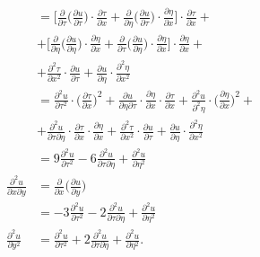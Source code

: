 \documentclass[11pt,a4paper]{article}
\theoremstyle{dotless}
\theoremstyle{dotlessdr}
\begin{document}
\begin{align*}
                                &= \Big[ \frac{\partial}{\partial \tau} \Big(\frac{\partial u}{\partial \tau}\Big) \cdot %
                                  \frac{\partial \tau}{\partial x} + \frac{\partial}{\partial \eta} \Big(\frac{\partial u}{\partial \tau}\Big) \cdot %
                                  \frac{\partial \eta}{\partial x} \Big] \cdot \frac{\partial \tau}{\partial x} + \\
                                &+ \Big[ \frac{\partial}{\partial \eta} \Big(\frac{\partial u}{\partial \eta}\Big) \cdot %
                                  \frac{\partial \eta}{\partial x} + \frac{\partial}{\partial \tau} \Big(\frac{\partial u}{\partial \eta}\Big) \cdot %
                                  \frac{\partial \eta}{\partial x} \Big] \cdot \frac{\partial \eta}{\partial x} + \\
                                &+ \frac{\partial^2 \tau}{\partial x^2} \cdot \frac{\partial u}{\partial \tau} + %
                                  \frac{\partial u}{\partial \eta} \cdot \frac{\partial^2 \eta}{\partial x^2} \\
                                &= \frac{\partial^2 u}{\partial \tau^2} \cdot \Big( \frac{\partial \tau}{\partial x} \Big)^2 + %
                                  \frac{\partial u}{\partial \eta \partial \tau} \cdot \frac{\partial \eta}{\partial x} \cdot \frac{\partial \tau}{\partial x} + %
                                  \frac{\partial^2 u}{\partial^2 \eta} \cdot \Big( \frac{\partial \eta}{\partial x} \Big)^2 + \\
                                &+ \frac{\partial^2 u}{\partial \tau\partial \eta} \cdot \frac{\partial \tau}{\partial x} \cdot \frac{\partial \eta}{\partial x} + %
                                  \frac{\partial^2 \tau}{\partial x^2} \cdot \frac{\partial u}{\partial \tau} + \frac{\partial u}{\partial \eta} \cdot %
                                  \frac{\partial^2 \eta}{\partial x^2} \\
                                &= 9 \frac{\partial^2 u}{\partial \tau^2} - %
                                      6 \frac{\partial^2 u}{\partial \tau \partial \eta} + %
                                      \frac{\partial^2 u}{\partial \eta^2} \\
  \frac{\partial^2 u}{\partial x \partial y} &= \frac{\partial}{\partial x}\Big( \frac{\partial u}{\partial y} \Big)\\
                                &= -3\frac{\partial^2 u}{\partial \tau^2} - %
                                               2 \frac{\partial ^2 u}{\partial \tau \partial \eta} + %
                                               \frac{\partial^2 u}{\partial \eta^2} \\
  \frac{\partial^2 u}{\partial y^2} &= \frac{\partial^2 u}{\partial \tau^2} + %
                                      2 \frac{\partial^2 u}{\partial \tau \partial \eta} + %
                                      \frac{\partial^2 u}{\partial \eta^2}.  
\end{align*}
\end{document}
